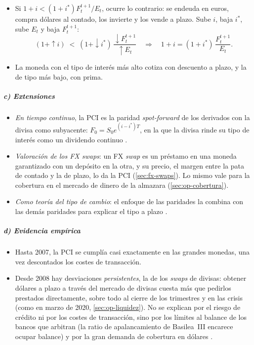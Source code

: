 \documentclass[11pt]{article}
\begin{document}
\begin{itemize}
\begin{itemize}
\[    \]
  \item Si $1+i<(1+i^{*})F_t^{t+1}/E_t$, ocurre lo contrario: se endeuda en euros, compra dólares al contado, los invierte y los vende a plazo. Sube $i$, baja $i^{*}$, sube $E_t$ y baja $F_t^{t+1}$:
    \[
    (1+{\uparrow}i)\;<\;(1+{\downarrow}i^{*})\,\frac{{\downarrow}F_t^{t+1}}{{\uparrow}E_t}\quad\Longrightarrow\quad 1+i=(1+i^{*})\,\frac{F_t^{t+1}}{E_t}.
    \]
  \item La moneda con el tipo de interés más alto cotiza con descuento a plazo, y la de tipo más bajo, con prima.
  \end{itemize}
\end{itemize}

\begin{infografia}[H]
\centering
\caption{Los 2~caminos del inversor: cubierto (PCI) y sin cubrir (PNCI)}\label{figu:dos-caminos}
\end{infografia}

\subparagraph{c) Extensiones}

\begin{itemize}
\item \emph{En tiempo continuo}, la PCI es la paridad \emph{spot-forward} de los derivados con la divisa como subyacente: $F_0=S_0e^{(i-i^{*})T}$, en la que la divisa rinde su tipo de interés como un dividendo continuo\nocite{Hull2022Options} .
\item \emph{Valoración de los FX swaps}: un FX \emph{swap} es un préstamo en una moneda garantizado con un depósito en la otra, y su precio, el margen entre la pata de contado y la de plazo, lo da la PCI (\ref{sec:fx-swaps}). Lo mismo vale para la cobertura en el mercado de dinero de la almazara (\ref{sec:op-cobertura}).
\item \emph{Como teoría del tipo de cambio}: el enfoque de las paridades la combina con las demás paridades para explicar el tipo a plazo .
\end{itemize}

\subparagraph{d) Evidencia empírica}

\begin{itemize}
\item Hasta 2007, la PCI se cumplía casi exactamente en las grandes monedas, una vez descontados los costes de transacción.
\item Desde 2008 hay desviaciones \emph{persistentes}, la  de los \emph{swaps} de divisas: obtener dólares a plazo a través del mercado de divisas cuesta más que pedirlos prestados directamente, sobre todo al cierre de los trimestres y en las crisis (como en marzo de 2020, \ref{sec:op-liquidez}). No se explican por el riesgo de crédito ni por los costes de transacción, sino por los límites al balance de los bancos que arbitran (la ratio de apalancamiento de Basilea~III encarece ocupar balance) y por la gran demanda de cobertura en dólares\nocite{DuTepperVerdelhan2018Deviations,BorioEtAl2016CIP} .
\end{itemize}
\end{document}
